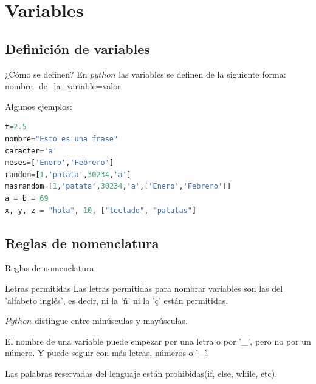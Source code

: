 \documentclass{beamer}
\begin{document}
\section{Variables}
\subsection{Definición de variables}
\begin{frame}[fragile]
\begin{block}{¿Cómo se definen?}
En $python$ las variables se definen de la siguiente forma: \\
nombre\_de\_la\_variable=valor
\end{block}
\pause
\begin{exampleblock}{}
Algunos ejemplos:
\end{exampleblock}
\begin{lstlisting}[language=Python]
t=2.5
nombre="Esto es una frase"
caracter='a'
meses=['Enero','Febrero']
random=[1,'patata',30234,'a']
masrandom=[1,'patata',30234,'a',['Enero','Febrero']]
a = b = 69
x, y, z = "hola", 10, ["teclado", "patatas"]
\end{lstlisting}
\end{frame}
\subsection{Reglas de nomenclatura}
\begin{frame}{Reglas de nomenclatura}
\begin{block}{Letras permitidas}
Las letras permitidas para nombrar variables son las del 'alfabeto inglés', es decir, ni la 'ñ' ni la 'ç' están permitidas.
\end{block}
\begin{block}{}
$Python$ distingue entre minúsculas y mayúsculas.
\end{block} \pause
\begin{block}{}
El nombre de una variable puede empezar por una letra o por '\_', pero no por un número. Y puede seguir con más letras, números o '\_'.
\end{block}
\begin{block}{}
Las palabras reservadas del lenguaje están prohibidas(if, else, while, etc).
\end{block}
\end{frame}
\end{document}
